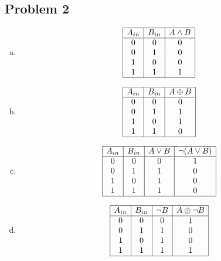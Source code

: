 \documentclass[a4paper]{article}
\begin{document}
  \subsection*{Problem 2}
  \begin{enumerate}[a)]

    \item \begin {displaymath} 
      \begin{array}{|c|c|c|}
        \hline
        A_{in} & B_{in} & A \land B\\
        \hline
        0 & 0 & 0\\
        0 & 1 & 0\\
        1 & 0 & 0\\
        1 & 1 & 1\\
        \hline
      \end{array}  
    \end{displaymath}
    
    
    \item \begin {displaymath} 
      \begin{array}{|c|c|c|}
        \hline
        A_{in} & B_{in} & A \oplus B\\
        \hline
        0 & 0 & 0\\
        0 & 1 & 1\\
        1 & 0 & 1\\
        1 & 1 & 0\\
        \hline
      \end{array}
    \end{displaymath}
    
    
    \item \begin {displaymath}
      \begin{array}{|c|c|c|c|}
        \hline
        A_{in} & B_{in} & A \lor B & \neg(A \lor B)\\
        \hline
        0 & 0 & 0 & 1\\
        0 & 1 & 1 & 0\\
        1 & 0 & 1 & 0\\
        1 & 1 & 1 & 0\\
        \hline
      \end{array}  
    \end{displaymath}
    
    
    \item \begin {displaymath}
      \begin{array}{|c|c|c|c|}
        \hline
        A_{in} & B_{in} & \neg B & A \oplus \neg B\\
        \hline
        0 & 0 & 0 & 1\\
        0 & 1 & 1 & 0\\
        1 & 0 & 1 & 0\\
        1 & 1 & 1 & 1\\
        \hline
      \end{array}
    \end{displaymath}
    
    

\end{enumerate}
\end{document}
